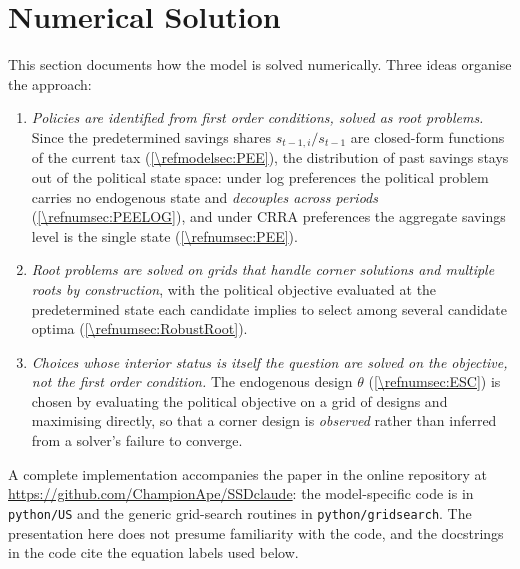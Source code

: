 \edef\refsec{\refnumsec}
\edef\refeq{\refnumeq}
\edef\refalg{\refnumalg}


\section{Numerical Solution}\label{\refsec}
This section documents how the model is solved numerically. Three ideas organise the approach:
\begin{enumerate}
    \item \emph{Policies are identified from first order conditions, solved as root problems.} Since the predetermined savings shares $s_{t-1,i}/s_{t-1}$ are closed-form functions of the current tax (\cref{\refmodelsec:PEE}), the distribution of past savings stays out of the political state space: under log preferences the political problem carries no endogenous state and \emph{decouples across periods} (\cref{\refsec:PEELOG}), and under CRRA preferences the aggregate savings level is the single state (\cref{\refsec:PEE}).
    \item \emph{Root problems are solved on grids that handle corner solutions and multiple roots by construction}, with the political objective evaluated at the predetermined state each candidate implies to select among several candidate optima (\cref{\refsec:RobustRoot}).
    \item \emph{Choices whose interior status is itself the question are solved on the objective, not the first order condition.} The endogenous design $\theta$ (\cref{\refsec:ESC}) is chosen by evaluating the political objective on a grid of designs and maximising directly, so that a corner design is \emph{observed} rather than inferred from a solver's failure to converge.
\end{enumerate}
A complete implementation accompanies the paper in the online repository at \url{https://github.com/ChampionApe/SSDclaude}: the model-specific code is in \texttt{python/US} and the generic grid-search routines in \texttt{python/gridsearch}. The presentation here does not presume familiarity with the code, and the docstrings in the code cite the equation labels used below.

